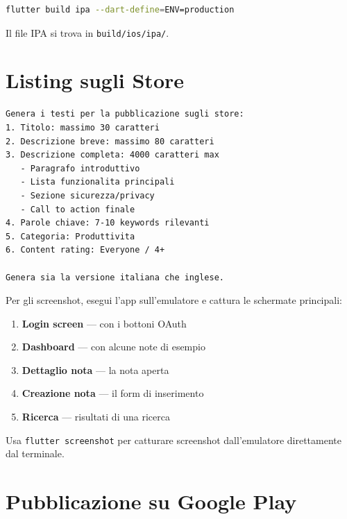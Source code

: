 \begin{lstlisting}[language=bash]
flutter build ipa --dart-define=ENV=production
\end{lstlisting}

Il file IPA si trova in \texttt{build/ios/ipa/}.

\section{Listing sugli Store}

\begin{praticabox}[title={Pratica --- Genera i testi con l'IA}]
\begin{lstlisting}[language={}]
Genera i testi per la pubblicazione sugli store:
1. Titolo: massimo 30 caratteri
2. Descrizione breve: massimo 80 caratteri
3. Descrizione completa: 4000 caratteri max
   - Paragrafo introduttivo
   - Lista funzionalita principali
   - Sezione sicurezza/privacy
   - Call to action finale
4. Parole chiave: 7-10 keywords rilevanti
5. Categoria: Produttivita
6. Content rating: Everyone / 4+

Genera sia la versione italiana che inglese.
\end{lstlisting}
\end{praticabox}

Per gli screenshot, esegui l'app sull'emulatore e cattura le schermate principali:

\begin{enumerate}
  \item \textbf{Login screen} --- con i bottoni OAuth
  \item \textbf{Dashboard} --- con alcune note di esempio
  \item \textbf{Dettaglio nota} --- la nota aperta
  \item \textbf{Creazione nota} --- il form di inserimento
  \item \textbf{Ricerca} --- risultati di una ricerca
\end{enumerate}

\begin{tipbox}
Usa \texttt{flutter screenshot} per catturare screenshot dall'emulatore direttamente dal terminale.
\end{tipbox}

\section{Pubblicazione su Google Play}

